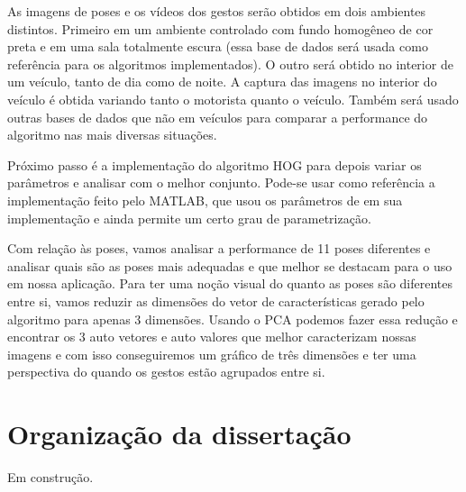 As imagens de poses e os vídeos dos gestos serão obtidos em  dois ambientes distintos. Primeiro em um ambiente controlado com fundo homogêneo de cor preta e em uma sala totalmente escura (essa base de dados será usada como referência para os algoritmos implementados). O outro será obtido no interior de um veículo, tanto de dia como de noite. A captura das imagens no interior do veículo é obtida variando tanto o motorista quanto o veículo. Também será usado outras bases de dados que não em veículos para comparar a performance do algoritmo nas mais diversas situações.

Próximo passo é a implementação do algoritmo HOG para depois variar os parâmetros e analisar com o melhor conjunto. Pode-se usar como referência a implementação feito pelo MATLAB, que usou os parâmetros de  em sua implementação e ainda permite um certo grau de parametrização.

Com relação às poses, vamos analisar a performance de 11 poses diferentes e analisar quais são as poses mais adequadas e que melhor se destacam para o uso em nossa aplicação. Para ter uma noção visual do quanto as poses são diferentes entre si, vamos reduzir as dimensões do vetor de características gerado pelo algoritmo para apenas 3 dimensões. Usando o PCA podemos fazer essa redução e encontrar os 3 auto vetores e auto valores que melhor caracterizam nossas imagens e com isso conseguiremos um gráfico de três dimensões e ter uma perspectiva do quando os gestos estão agrupados entre si.

\section{Organização da dissertação}

Em construção.

